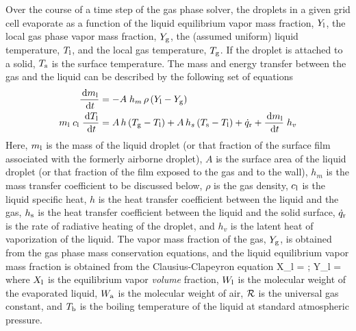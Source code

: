 Over the course of a time step of the gas phase solver, the droplets in a given grid cell evaporate as a function of the liquid equilibrium vapor mass fraction, $Y_{\rm l}$, the local gas phase vapor mass fraction, $Y_{\rm g}$, the (assumed uniform) liquid temperature, $T_{\rm l}$, and the local gas temperature, $T_{\rm g}$. If the droplet is attached to a solid, $T_{\rm s}$ is the surface temperature. The mass and energy transfer between the gas and the liquid can be described by the following set of equations~\cite{Cheremisinoff:1}
\begin{align}
\frac{\,\mathrm{d} m_{\rm l}}{\,\mathrm{d} t}               & =  - A \; h_m \, \rho \, (Y_{\rm l} - Y_{\rm g}) \\
m_{\rm l} \; c_{\rm l} \; \frac{\,\mathrm{d} T_{\rm l}}{\,\mathrm{d} t} & =    A \, h  \, (T_{\rm g}-T_{\rm l}) + A \, h_s \, (T_{\rm s}-T_{\rm l}) + \dot{q}_{\rm r} + \frac{\,\mathrm{d} m_{\rm l}}{\,\mathrm{d} t} \; h_v  \label{droplet_temp}   \end{align}
Here, $m_{\rm l}$ is the mass of the liquid droplet (or that fraction of the surface film associated with the formerly airborne droplet), $A$ is the surface area of the liquid droplet (or that fraction of the film exposed to the gas and to the wall), $h_m$ is the mass transfer coefficient to be discussed below,
$\rho$ is the gas density, $c_{\rm l}$ is the liquid specific heat, $h$ is the heat transfer coefficient between the liquid and the gas, $h_{\rm s}$ is the heat transfer coefficient between the liquid and the solid surface, $\dot{q}_{\rm r}$ is the rate of radiative heating of the droplet, and $h_v$ is the latent heat of vaporization of the liquid. The vapor mass fraction of the gas, $Y_{\rm g}$, is obtained from the gas phase mass conservation equations, and the liquid equilibrium vapor mass fraction is obtained from the Clausius-Clapeyron equation
\be X_{\rm l} =  \exp {}  \quad ; \quad
      Y_{\rm l} =   \label{clausius_clapeyron} \ee
where $X_{\rm l}$ is the equilibrium vapor {\em volume} fraction, $W_{\rm l}$ is the molecular weight of the evaporated liquid, $W_{\rm a}$ is the molecular weight of air, $\cal R$ is the universal gas constant, and $T_{\rm b}$ is the boiling temperature of the liquid at standard atmospheric pressure.


